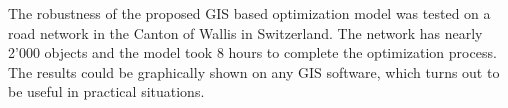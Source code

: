 \documentclass[a4paper,3p,times,authoryear]{elsarticle}
\begin{document}
The robustness of the proposed GIS based optimization model was tested on a road network in the Canton of Wallis in Switzerland. The network has nearly 2'000 objects and the model took 8 hours to complete the optimization process. The results could be graphically shown on any GIS software, which turns out to be useful in practical situations.


%
 

\end{document}
